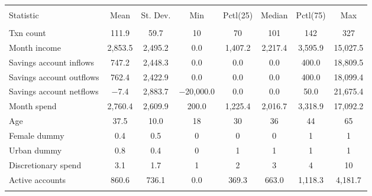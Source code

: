 
\begin{tabular}{@{\extracolsep{5pt}}lccccccc} 
\\[-1.8ex]\hline 
\hline \\[-1.8ex] 
Statistic & \multicolumn{1}{c}{Mean} & \multicolumn{1}{c}{St. Dev.} & \multicolumn{1}{c}{Min} & \multicolumn{1}{c}{Pctl(25)} & \multicolumn{1}{c}{Median} & \multicolumn{1}{c}{Pctl(75)} & \multicolumn{1}{c}{Max} \\ 
\hline \\[-1.8ex] 
Txn count & 111.9 & 59.7 & 10 & 70 & 101 & 142 & 327 \\ 
Month income & 2,853.5 & 2,495.2 & 0.0 & 1,407.2 & 2,217.4 & 3,595.9 & 15,027.5 \\ 
Savings account inflows & 747.2 & 2,448.3 & 0.0 & 0.0 & 0.0 & 400.0 & 18,809.5 \\ 
Savings account outflows & 762.4 & 2,422.9 & 0.0 & 0.0 & 0.0 & 400.0 & 18,099.4 \\ 
Savings account netflows & $-$7.4 & 2,883.7 & $-$20,000.0 & 0.0 & 0.0 & 50.0 & 21,675.4 \\ 
Month spend & 2,760.4 & 2,609.9 & 200.0 & 1,225.4 & 2,016.7 & 3,318.9 & 17,092.2 \\ 
Age & 37.5 & 10.0 & 18 & 30 & 36 & 44 & 65 \\ 
Female dummy & 0.4 & 0.5 & 0 & 0 & 0 & 1 & 1 \\ 
Urban dummy & 0.8 & 0.4 & 0 & 1 & 1 & 1 & 1 \\ 
Discretionary spend & 3.1 & 1.7 & 1 & 2 & 3 & 4 & 10 \\ 
Active accounts & 860.6 & 736.1 & 0.0 & 369.3 & 663.0 & 1,118.3 & 4,181.7 \\ 
\hline \\[-1.8ex] 
\end{tabular} 
